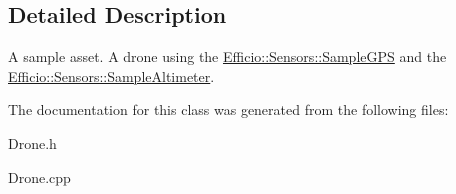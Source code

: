 \subsection{Detailed Description}
A sample asset. A drone using the \hyperlink{class_efficio_1_1_sensors_1_1_sample_g_p_s}{Efficio\+::\+Sensors\+::\+Sample\+G\+PS} and the \hyperlink{class_efficio_1_1_sensors_1_1_sample_altimeter}{Efficio\+::\+Sensors\+::\+Sample\+Altimeter}. 

The documentation for this class was generated from the following files\+:\begin{DoxyCompactItemize}
\item 
Drone.\+h\item 
Drone.\+cpp\end{DoxyCompactItemize}
